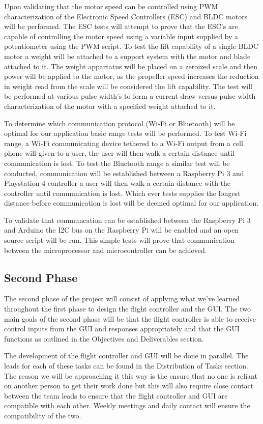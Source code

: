 Upon validating that the motor speed can be controlled using PWM characterization of the Electronic Speed Controllers (ESC) and BLDC motors will be performed. The ESC tests will attempt to prove that the ESC's are capable of controlling the motor speed using a variable input supplied by a potentiometer using the PWM script. To test the lift capability of a single BLDC motor a weight will be attached to a support system with the motor and blade attached to it. The weight appartatus will be placed on a zeroized scale and then power will be applied to the motor, as the propeller speed increases the reduction in weight read from the scale will be considered the lift capability. The test will be performed at various pulse width's to form a current draw versus pulse width characterization of the motor with a specified weight attached to it. 

To determine which communication protocol (Wi-Fi or Bluetooth) will be optimal for our application basic range tests will be performed. To test Wi-Fi range, a Wi-Fi communicating device tethered to a Wi-Fi output from a cell phone will given to a user, the user will then walk a certain distance until communication is lost. To test the Bluetooth range a similar test will be conducted, communication will be established between a Raspberry Pi 3 and Playstation 4 controller a user will then walk a certain distance with the controller until communication is lost. Which ever tests supplies the longest distance before communication is lost will be deemed optimal for our application.

To validate that communcation can be established between the Raspberry Pi 3 and Arduino the I2C bus on the Raspberry Pi will be enabled and an open source script will be run. This simple tests will prove that communication between the microprocessor and microcontroller can be achieved.

\subsection{Second Phase}
The second phase of the project will consist of applying what we've learned throughout the first phase to design the flight controller and the GUI. The two main goals of the second phase will be that the flight controller is able to receive control inputs from the GUI and responses appropriately and that the GUI functions as outlined in the Objectives and Deliverables section.

The development of the flight controller and GUI will be done in parallel. The leads for each of these tasks can be found in the Distribution of Tasks section. The reason we will be approaching it this way is the ensure that no one is reliant on another person to get their work done but this will also require close contact between the team leads to ensure that the flight controller and GUI are compatible with each other. Weekly meetings and daily contact will ensure the compatibility of the two.